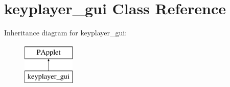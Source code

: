 \hypertarget{classkeyplayer__gui}{\section{keyplayer\+\_\+gui Class Reference}
\label{classkeyplayer__gui}
}
Inheritance diagram for keyplayer\+\_\+gui\+:\begin{figure}[H]
\begin{center}
\leavevmode
\includegraphics[height=2.000000cm]{classkeyplayer__gui}
\end{center}
\end{figure}
